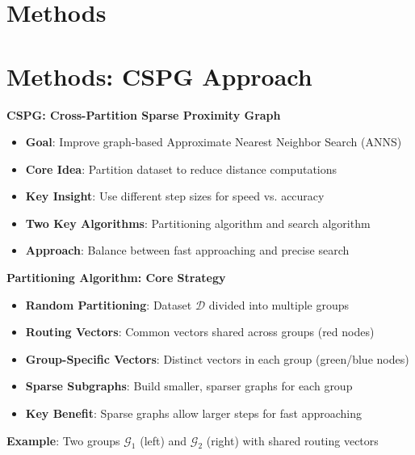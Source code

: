 \section{Methods}%
\section{Methods: CSPG Approach}%
\begin{frame}
\begin{center}
\LARGE\textbf{CSPG: Cross-Partition Sparse Proximity Graph}
\end{center}

\vspace{0.5cm}

\begin{itemize}
    \item \textbf{Goal}: Improve graph-based Approximate Nearest Neighbor Search (ANNS)
    \item \textbf{Core Idea}: Partition dataset to reduce distance computations
    \item \textbf{Key Insight}: Use different step sizes for speed vs. accuracy
    \item \textbf{Two Key Algorithms}: Partitioning algorithm and search algorithm
    \item \textbf{Approach}: Balance between fast approaching and precise search
\end{itemize}
\end{frame}%
\begin{frame}
\begin{center}
\Large\textbf{Partitioning Algorithm: Core Strategy}
\end{center}

\vspace{0.3cm}

\begin{itemize}
    \item \textbf{Random Partitioning}: Dataset $\mathcal{D}$ divided into multiple groups
    \item \textbf{Routing Vectors}: Common vectors shared across groups (red nodes)
    \item \textbf{Group-Specific Vectors}: Distinct vectors in each group (green/blue nodes)
    \item \textbf{Sparse Subgraphs}: Build smaller, sparser graphs for each group
    \item \textbf{Key Benefit}: Sparse graphs allow larger steps for fast approaching
\end{itemize}

\vspace{0.3cm}

\textbf{Example}: Two groups $\mathcal{G}_1$ (left) and $\mathcal{G}_2$ (right) with shared routing vectors
\end{frame}%

